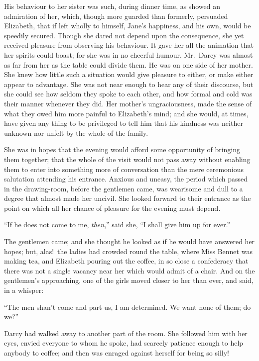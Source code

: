 \documentclass[12pt,english]{book}
\begin{document}
His behaviour to her sister was such, during dinner time, as showed
an admiration of her, which, though more guarded than formerly, persuaded
Elizabeth, that if left wholly to himself, Jane's happiness, and his
own, would be speedily secured. Though she dared not depend upon the
consequence, she yet received pleasure from observing his behaviour.
It gave her all the animation that her spirits could boast; for she
was in no cheerful humour. Mr.\ Darcy was almost as far from her
as the table could divide them. He was on one side of her mother.
She knew how little such a situation would give pleasure to either,
or make either appear to advantage. She was not near enough to hear
any of their discourse, but she could see how seldom they spoke to
each other, and how formal and cold was their manner whenever they
did. Her mother's ungraciousness, made the sense of what they owed
him more painful to Elizabeth's mind; and she would, at times, have
given any thing to be privileged to tell him that his kindness was
neither unknown nor unfelt by the whole of the family.

She was in hopes that the evening would afford some opportunity of
bringing them together; that the whole of the visit would not pass
away without enabling them to enter into something more of conversation
than the mere ceremonious salutation attending his entrance. Anxious
and uneasy, the period which passed in the drawing-room, before the
gentlemen came, was wearisome and dull to a degree that almost made
her uncivil. She looked forward to their entrance as the point on
which all her chance of pleasure for the evening must depend.

{}``If he does not come to me, \textit{then},'' said she, {}``I
shall give him up for ever.''

The gentlemen came; and she thought he looked as if he would have
answered her hopes; but, alas!\ the ladies had crowded round the
table, where Miss Bennet was making tea, and Elizabeth pouring out
the coffee, in so close a confederacy that there was not a single
vacancy near her which would admit of a chair. And on the gentlemen's
approaching, one of the girls moved closer to her than ever, and said,
in a whisper:

{}``The men shan't come and part us, I am determined. We want none
of them; do we?''\ 

Darcy had walked away to another part of the room. She followed him
with her eyes, envied everyone to whom he spoke, had scarcely patience
enough to help anybody to coffee; and then was enraged against herself
for being so silly!
\end{document}
